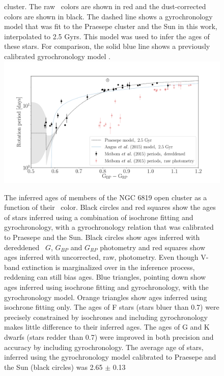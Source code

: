 {\begin{figure}
{    cluster.
    The raw \gcolor\ colors are shown in red and the dust-corrected colors are
    shown in black.
    The dashed line shows a gyrochronology model that was fit to the Praesepe
    cluster and the Sun in this work, interpolated to 2.5 Gyrs.
    This model was used to infer the ages of these stars.
    For comparison, the solid blue line shows a previously calibrated
    gyrochronology model \citep{angus2015}.
}
  \centering
    \includegraphics[width=1\textwidth]{NGC6819}
\label{fig:NGC6819}
\end{figure}
\begin{figure}
  \caption{
    The inferred ages of members of the NGC 6819 open cluster as a function of
    their \gcolor\ color.
    Black circles and red squares show the ages of stars inferred using a
    combination of isochrone fitting and gyrochronology, with a gyrochronology
    relation that was calibrated to Praesepe and the Sun.
    Black circles show ages inferred with dereddened \gaia\ $G$, $G_{BP}$ and
    $G_{RP}$ photometry and red squares show ages inferred with uncorrected,
    raw, photometry.
    Even though V-band extinction is marginalized over in the inference
    process, reddening can still bias ages.
    Blue triangles, pointing down show ages inferred using isochrone fitting
    and gyrochronology, with the \citet{angus2015} gyrochronology model.
    Orange triangles show ages inferred using isochrone fitting only.
    The ages of F stars (stars bluer than 0.7) were precisely constrained by
    isochrones and including gyrochronology makes little difference to their
    inferred ages.
    The ages of G and K dwarfs (stars redder than 0.7) were improved in both
    precision and accuracy by including gyrochronology.
    The average age of stars, inferred using the gyrochronology model
    calibrated to Praesepe and the Sun (black circles) was 2.65 $\pm$ 0.13
}
\end{figure}}
